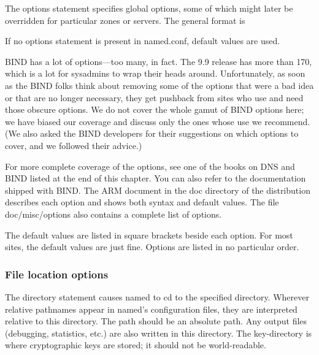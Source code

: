 \protect\hypertarget{part0024_split_037.htmlux5cux23_idIndexMarker2120}{}{}The
{options} statement specifies global options, some of which might later
be overridden for particular zones or servers. The general format is


If no {options} statement is present in {named.conf}, default values are
used.

BIND has a lot of options---too many, in fact. The 9.9 release has more
than 170, which is a lot for sysadmins to wrap their heads around.
Unfortunately, as soon as the BIND folks think about removing some of
the options that were a bad idea or that are no longer necessary, they
get pushback from sites who use and need those obscure options. We do
not cover the whole gamut of BIND options here; we have biased our
coverage and discuss only the ones whose use we recommend. (We also
asked the BIND developers for their suggestions on which options to
cover, and we followed their advice.)

For more complete coverage of the options, see one of the books on DNS
and BIND listed at the end of this chapter. You can also refer to the
documentation shipped with BIND. The {ARM} document in the {doc}
directory of the distribution describes each option and shows both
syntax and default values. The file {doc/misc/options} also contains a
complete list of options.

The default values are listed in square brackets beside each option. For
most sites, the default values are just fine. Options are listed in no
particular order.

\subsubsection{File location options}


The
\protect\hypertarget{part0024_split_037.htmlux5cux23_idIndexMarker2121}{}{}{directory}
statement causes {named} to {cd} to the specified directory. Wherever
relative pathnames appear in {named}'s configuration files, they are
interpreted relative to this directory. The {path} should be an absolute
path. Any output files (debugging, statistics, etc.) are also written in
this directory. The
\protect\hypertarget{part0024_split_037.htmlux5cux23_idIndexMarker2122}{}{}{key-directory}
is where cryptographic keys are stored; it should not be world-readable.

